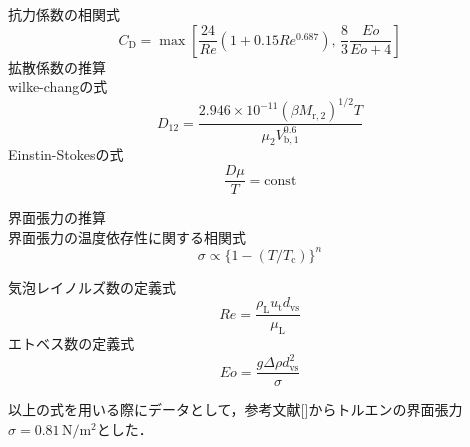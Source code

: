 \documentclass[a4j]{jsreport}
\begin{document}
抗力係数の相関式
\begin{equation}
    C_\mathrm{D} = \max \left[ \frac{24}{Re}(1+0.15Re^{0.687}), \, \frac{8}{3} \frac{Eo}{Eo+4} \right]
\end{equation}
拡散係数の推算\\
wilke-changの式
\begin{equation}
    D_{12} = \frac{2.946\times 10^{-11}(\beta M_{\mathrm{r,2}})^{1/2} T} {\mu_2 V_{\mathrm{b},1}^{0.6}}
\end{equation}
Einstin-Stokesの式
\begin{equation}
    \frac{D \mu}{T} = \text{const}
\end{equation}

界面張力の推算\\
界面張力の温度依存性に関する相関式
\begin{equation}
    \sigma \propto \{ 1-(T/T_\mathrm{c}) \}^n
\end{equation}

気泡レイノルズ数の定義式
\begin{equation}
    Re = \frac{\rho_\mathrm{L}u_\mathrm{t} d_\mathrm{vs}}{\mu_\mathrm{L}}
\end{equation}
エトベス数の定義式
\begin{equation}
    Eo = \frac{g \varDelta \rho d_\mathrm{vs}^2}{\sigma}
\end{equation}

以上の式を用いる際にデータとして，参考文献[]からトルエンの界面張力$\sigma=0.81 \,\si{\newton \per \square \metre}$とした．
\end{document}
